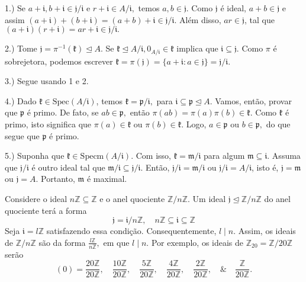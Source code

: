 \documentclass[algebraII_notes.tex]{subfiles}
\begin{document}
\begin{proof*}
	1.) Se \(a+\mathfrak{i}, b+\mathfrak{i}\in \mathfrak{j}/\mathfrak{i}\) e \(r+\mathfrak{i}\in A/\mathfrak{i},\) temos
	\(a, b\in \mathfrak{j}.\) Como \(\mathfrak{j}\) é ideal, \(a+b\in \mathfrak{j}\) e assim \((a+\mathfrak{i}) + (b+\mathfrak{i}) = (a+b)
	+\mathfrak{i}\in \mathfrak{j}/\mathfrak{i}.\) Além disso, \(ar\in \mathfrak{j}\), tal que \((a+\mathfrak{i})(r+\mathfrak{i})=ar + \mathfrak{i}\in
	\mathfrak{j}/\mathfrak{i}.\)

	2.) Tome \(\mathfrak{j} = \pi^{-1}(\mathfrak{k})\trianglelefteq{A}.\) Se \(\mathfrak{k}\trianglelefteq{A/\mathfrak{i}}, 0_{A/\mathfrak{i}}\in \mathfrak{k}\)
	implica que \(\mathfrak{i}\subseteq{\mathfrak{j}}.\) Como \(\pi \) é sobrejetora, podemos escrever
	\(\mathfrak{k} = \pi(\mathfrak{j}) = \{a+\mathfrak{i}: a\in \mathfrak{j}\} = \mathfrak{j}/\mathfrak{i}.\)

	3.) Segue usando 1 e 2.

	4.) Dado \(\mathfrak{k}\in \mathrm{Spec}(A/\mathfrak{i})\), temos \(\mathfrak{k} = \mathfrak{p}/\mathfrak{i},\)
	para \(\mathfrak{i}\subseteq{\mathfrak{p}}\trianglelefteq{A}.\) Vamos, então, provar que \(\mathfrak{p}\) é primo.
	De fato, se \(ab\in \mathfrak{p},\) então \(\pi (ab)=\pi(a)\pi(b)\in \mathfrak{k}\). Como \(\mathfrak{k}\) é primo,
	isto significa que \(\pi(a)\in \mathfrak{k}\) ou \(\pi(b)\in \mathfrak{k}\). Logo, \(a\in \mathfrak{p}\) ou \(b\in \mathfrak{p},\) do que
	segue que \(\mathfrak{p}\) é primo.

	5.) Suponha que \(\mathfrak{k}\in \mathrm{Specm}(A/\mathfrak{i}).\) Com isso, \(\mathfrak{k} = \mathfrak{m}/\mathfrak{i}\)
	para algum \(\mathfrak{m}\subseteq{\mathfrak{i}}.\) Assuma que \(\mathfrak{j}/\mathfrak{i}\) é outro ideal tal que \(\mathfrak{m}/\mathfrak{i}\subseteq{\mathfrak{j}/\mathfrak{i}}.\)
	Então, \(\mathfrak{j}/\mathfrak{i} = \mathfrak{m}/\mathfrak{i}\) ou \(\mathfrak{j}/\mathfrak{i} = A/\mathfrak{i}\), isto é,
	\(\mathfrak{j} = \mathfrak{m}\) ou \(\mathfrak{j} = A\). Portanto, \(\mathfrak{m} \) é maximal. \qedsymbol
\end{proof*}
\begin{example}
	Considere o ideal \(n \mathbb{Z}\subseteq \mathbb{Z}\) e o anel quociente \(\mathbb{Z}/n \mathbb{Z}.\)
	Um ideal \(\mathfrak{j}\trianglelefteq \mathbb{Z}/n \mathbb{Z}\) do anel quociente terá a forma
	\[
		\mathfrak{j} = \mathfrak{i}/n \mathbb{Z},\quad n \mathbb{Z}\subseteq \mathfrak{i}\subseteq \mathbb{Z}
	\]
	Seja \(\mathfrak{i} = l \mathbb{Z}\) satisfazendo essa condição. Consequentemente, \(l\mid n\). Assim, os ideais de
	\(\mathbb{Z}/n \mathbb{Z}\) são da forma \(\frac{l \mathbb{Z}}{n \mathbb{Z}},\) em que \(l\mid n\). Por exemplo, os ideais
	de \(\mathbb{Z}_{20} = \mathbb{Z}/20 \mathbb{Z}\) serão
	\[
		(0) = \frac{20 \mathbb{Z}}{20 \mathbb{Z}},\quad \frac{10 \mathbb{Z}}{20 \mathbb{Z}}, \quad \frac{5 \mathbb{Z}}{20 \mathbb{Z}},\quad \frac{4 \mathbb{Z}}{20 \mathbb{Z}}, \quad \frac{2 \mathbb{Z}}{20 \mathbb{Z}}, \quad\&\quad \frac{\mathbb{Z}}{20 \mathbb{Z}}.
	\]
\end{example}
\end{document}
